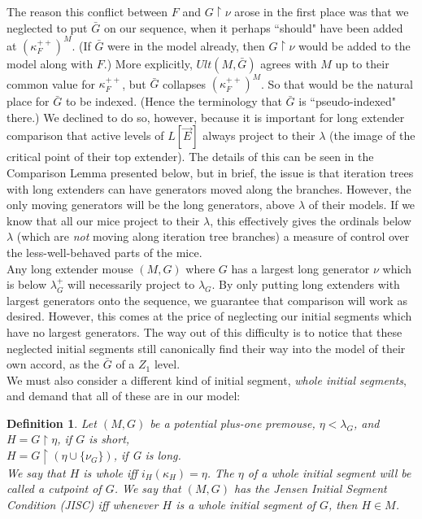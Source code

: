 \documentclass[12pt]{article}
\newtheorem{defn}[thm]{Definition}
\begin{document}
The reason this conflict between $F$ and $G \restriction \nu$ arose in the first place was that we neglected to put $\bar{G}$ on our sequence, when it perhaps ``should" have been added at $(\kappa_F^{++} )^M$.  (If $\bar{G}$ were in the model already, then $G \restriction \nu$ would be added to the model along with $F$.)  More explicitly, $Ult(M , \bar{G})$ agrees with $M$ up to their common value for $\kappa_F^{++}$, but $\bar{G}$ collapses $(\kappa_F^{++})^M$.  So that would be the natural place for $\bar{G}$ to be indexed.  (Hence the terminology that $\bar{G}$ is ``pseudo-indexed" there.)  We declined to do so, however, because it is important for long extender comparison that active levels of $L[\vec{E}]$ always project to their $\lambda$ (the image of the critical point of their top extender).  The details of this can be seen in the Comparison Lemma presented below, but in brief, the issue is that iteration trees with long extenders can have generators moved along the branches.  However, the only moving generators will be the long generators, above $\lambda$ of their models.  If we know that all our mice project to their $\lambda$, this effectively gives the ordinals below $\lambda$ (which are \textit{not} moving along iteration tree branches) a measure of control over the less-well-behaved parts of the mice.\\

Any long extender mouse $(M, G)$ where $G$ has a largest long generator $\nu$ which is below $\lambda_G^+$ will necessarily project to $\lambda_G$.  By only putting long extenders with largest generators onto the sequence, we guarantee that comparison will work as desired.  However, this comes at the price of neglecting our initial segments which have no largest generators.  The way out of this difficulty is to notice that these neglected initial segments still canonically find their way into the model of their own accord, as the $\bar{G}$ of a $Z_1$ level.\\



We must also consider a different kind of initial segment, \textit{whole initial segments}, and demand that all of these are in our model:\\

\begin{defn} \label{JISC} Let $(M, G)$ be a potential plus-one premouse, $\eta < \lambda_G$, and\\

	$H = G \restriction \eta$, if $G$ is short,\\
	
	$H = G \restriction (\eta \cup \{ \nu_G \} )$, if G is long.\\
	
	We say that $H$ is \textit{whole} iff $i_H (\kappa_H) = \eta$.  The $\eta$ of a whole initial segment will be called a \textit{cutpoint} of $G$.  We say that $(M, G)$ has the Jensen Initial Segment Condition (JISC) iff whenever $H$ is a whole initial segment of $G$, then $H \in M$.
\end{defn}
\end{document}
